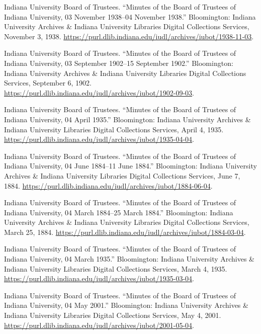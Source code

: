 \documentclass[
  american,
  letterpaper,
]{scrreprt}
\newlength{\cslhangindent}
\newenvironment{CSLReferences}[2] %
 {\begin{list}{}{%
  \setlength{\itemindent}{0pt}
  \setlength{\leftmargin}{0pt}
  \setlength{\parsep}{0pt}
  \ifodd #1
   \setlength{\leftmargin}{\cslhangindent}
   \setlength{\itemindent}{-1\cslhangindent}
  \fi
  \setlength{\itemsep}{#2\baselineskip}}}
 {\end{list}}
\begin{document}
\begin{CSLReferences}{1}{0}
Indiana University Board of Trustees. {``Minutes of the Board of
Trustees of Indiana University, 03 November 1938--04 November 1938.''}
Bloomington: Indiana University Archives \& Indiana University Libraries
Digital Collections Services, November 3, 1938.
\url{https://purl.dlib.indiana.edu/iudl/archives/iubot/1938-11-03}.

Indiana University Board of Trustees. {``Minutes of the Board of
Trustees of Indiana University, 03 September 1902--15 September 1902.''}
Bloomington: Indiana University Archives \& Indiana University Libraries
Digital Collections Services, September 6, 1902.
\url{https://purl.dlib.indiana.edu/iudl/archives/iubot/1902-09-03}.

Indiana University Board of Trustees. {``Minutes of the Board of
Trustees of Indiana University, 04 April 1935.''} Bloomington: Indiana
University Archives \& Indiana University Libraries Digital Collections
Services, April 4, 1935.
\url{https://purl.dlib.indiana.edu/iudl/archives/iubot/1935-04-04}.

Indiana University Board of Trustees. {``Minutes of the Board of
Trustees of Indiana University, 04 June 1884--11 June 1884.''}
Bloomington: Indiana University Archives \& Indiana University Libraries
Digital Collections Services, June 7, 1884.
\url{https://purl.dlib.indiana.edu/iudl/archives/iubot/1884-06-04}.

Indiana University Board of Trustees. {``Minutes of the Board of
Trustees of Indiana University, 04 March 1884--25 March 1884.''}
Bloomington: Indiana University Archives \& Indiana University Libraries
Digital Collections Services, March 25, 1884.
\url{https://purl.dlib.indiana.edu/iudl/archives/iubot/1884-03-04}.

Indiana University Board of Trustees. {``Minutes of the Board of
Trustees of Indiana University, 04 March 1935.''} Bloomington: Indiana
University Archives \& Indiana University Libraries Digital Collections
Services, March 4, 1935.
\url{https://purl.dlib.indiana.edu/iudl/archives/iubot/1935-03-04}.

Indiana University Board of Trustees. {``Minutes of the Board of
Trustees of Indiana University, 04 May 2001.''} Bloomington: Indiana
University Archives \& Indiana University Libraries Digital Collections
Services, May 4, 2001.
\url{https://purl.dlib.indiana.edu/iudl/archives/iubot/2001-05-04}.


\end{CSLReferences}
\end{document}
